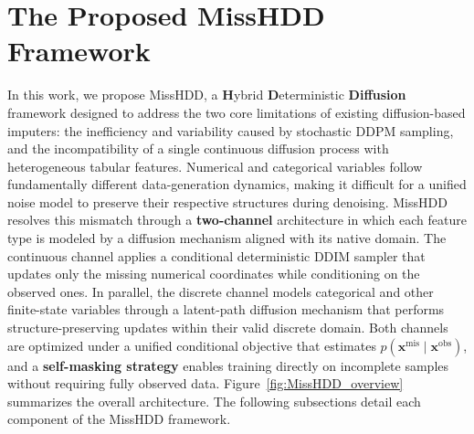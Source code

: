 \documentclass[times, review, 10pt]{elsarticle}
\newcommand{\DIFaddbegin}{\begingroup\color{blue}}
\newcommand{\DIFaddend}{\endgroup}
\begin{document}

\section{The Proposed MissHDD Framework}

\DIFaddbegin
In this work, we propose MissHDD, a \textbf{H}ybrid \textbf{D}eterministic \textbf{Diffusion} framework designed to address the two core limitations of existing diffusion-based imputers: the inefficiency and variability caused by stochastic DDPM sampling, and the incompatibility
\DIFaddend
of a single continuous diffusion process with heterogeneous tabular
features. Numerical and categorical variables follow fundamentally different
data-generation dynamics, making it difficult for a unified noise model to
preserve their respective structures during denoising. MissHDD resolves this
mismatch through a \textbf{two-channel} architecture in which each feature type is
modeled by a diffusion mechanism aligned with its native domain. The continuous channel applies a conditional deterministic DDIM sampler that updates only the missing numerical coordinates while conditioning on the observed ones. In parallel, the discrete channel models categorical and other
finite-state variables through a latent-path diffusion mechanism that performs
structure-preserving updates within their valid discrete domain. Both channels are optimized under a unified conditional objective that
estimates \(p(\mathbf{x}^{\mathrm{mis}} \mid \mathbf{x}^{\mathrm{obs}})\), and a
\textbf{self-masking strategy} enables training directly on incomplete samples without
requiring fully observed data. Figure~\ref{fig:MissHDD_overview} summarizes
the overall architecture. The following subsections detail each component of
the MissHDD framework.
\end{document}
